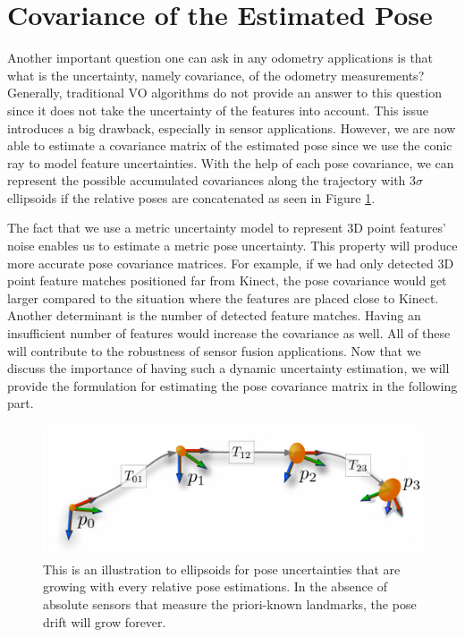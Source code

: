 \documentclass[a4paper]{report}
\numberwithin{figure}{section}
\begin{document}
\section{Covariance of the Estimated Pose} \label{sc_covariance_estim} 

Another important question one can ask in any odometry applications is that
what is the uncertainty, namely covariance, of the odometry measurements?
Generally, traditional VO algorithms do not provide an answer to this question
since it does not take the uncertainty of the features into account.  This
issue introduces a big drawback, especially in sensor applications.  However,
we are now able to estimate a covariance matrix of the estimated pose since we
use the conic ray to model feature uncertainties.  With the help of each pose
covariance, we can represent the possible accumulated covariances along the
trajectory with $3\sigma$ ellipsoids if the relative poses are concatenated as
seen in Figure \ref{fig:pose_uncertainty}. 

The fact that we use a metric uncertainty model to represent 3D point features'
noise enables us to estimate a metric pose uncertainty. This property will
produce more accurate pose covariance matrices.  For example, if we had only
detected 3D point feature matches positioned far from Kinect, the pose
covariance would get larger compared to the situation where the features are
placed close to Kinect.  Another determinant is the number of detected feature
matches. Having an insufficient number of features would increase the
covariance as well.  All of these will contribute to the robustness of sensor
fusion applications.  Now that we discuss the importance of having such a
dynamic uncertainty estimation, we will provide the formulation for estimating
the pose covariance matrix in the following part. 

\begin{figure}[H] \centering
\includegraphics[width=0.7\linewidth,natwidth=640,natheight=640]
{fig/drawings/pose_uncertainty.pdf} \caption[Pose Uncertainty]{This is an
illustration to ellipsoids for pose uncertainties that are growing with every
relative pose estimations. In the absence of absolute sensors that measure the
priori-known landmarks, the pose drift will grow forever.}
\label{fig:pose_uncertainty} \end{figure}
\end{document}
